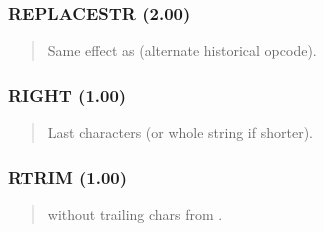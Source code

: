 \documentclass[letterpaper,10pt,english]{sphinxmanual}
\begin{document}
\subsubsection{REPLACESTR (2.00)}
\label{\detokenize{ppl:replacestr-2-00}}\begin{quote}

\sphinxAtStartPar
{}
\begin{description}
\sphinxAtStartPar
Same effect as  (alternate historical opcode).

\end{description}
\end{quote}


\subsubsection{RIGHT (1.00)}
\label{\detokenize{ppl:right-1-00}}\begin{quote}

\sphinxAtStartPar
{}
\begin{description}
\sphinxAtStartPar
Last  characters (or whole string if shorter).

\end{description}
\end{quote}


\subsubsection{RTRIM (1.00)}
\label{\detokenize{ppl:rtrim-1-00}}\begin{quote}

\sphinxAtStartPar
{}
\begin{description}
\sphinxAtStartPar
{} without trailing chars from .

\end{description}
\end{quote}
\end{document}
